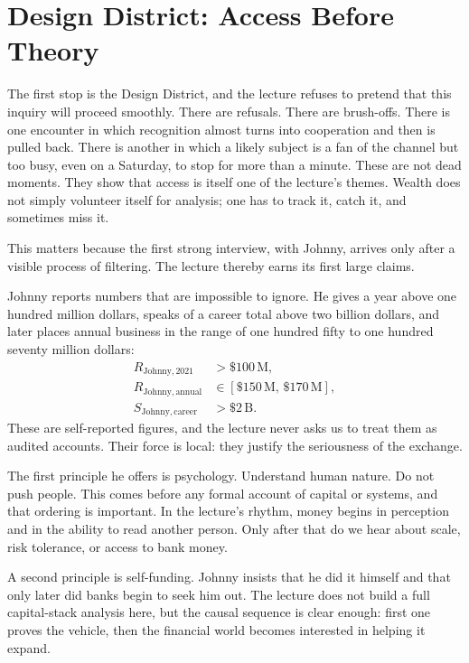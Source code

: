\section{Design District: Access Before Theory}

The first stop is the Design District, and the lecture refuses to pretend that this inquiry will proceed smoothly. There are refusals. There are brush-offs. There is one encounter in which recognition almost turns into cooperation and then is pulled back. There is another in which a likely subject is a fan of the channel but too busy, even on a Saturday, to stop for more than a minute. These are not dead moments. They show that access is itself one of the lecture's themes. Wealth does not simply volunteer itself for analysis; one has to track it, catch it, and sometimes miss it.

This matters because the first strong interview, with Johnny, arrives only after a visible process of filtering. The lecture thereby earns its first large claims.

Johnny reports numbers that are impossible to ignore. He gives a year above one hundred million dollars, speaks of a career total above two billion dollars, and later places annual business in the range of one hundred fifty to one hundred seventy million dollars:
\begin{align}
R_{\mathrm{Johnny},2021} &> \$100\,\mathrm{M},\\
R_{\mathrm{Johnny,annual}} &\in [\$150\,\mathrm{M},\,\$170\,\mathrm{M}],\\
S_{\mathrm{Johnny,career}} &> \$2\,\mathrm{B}.
\end{align}
These are self-reported figures, and the lecture never asks us to treat them as audited accounts. Their force is local: they justify the seriousness of the exchange.

The first principle he offers is psychology. Understand human nature. Do not push people. This comes before any formal account of capital or systems, and that ordering is important. In the lecture's rhythm, money begins in perception and in the ability to read another person. Only after that do we hear about scale, risk tolerance, or access to bank money.

A second principle is self-funding. Johnny insists that he did it himself and that only later did banks begin to seek him out. The lecture does not build a full capital-stack analysis here, but the causal sequence is clear enough: first one proves the vehicle, then the financial world becomes interested in helping it expand.

